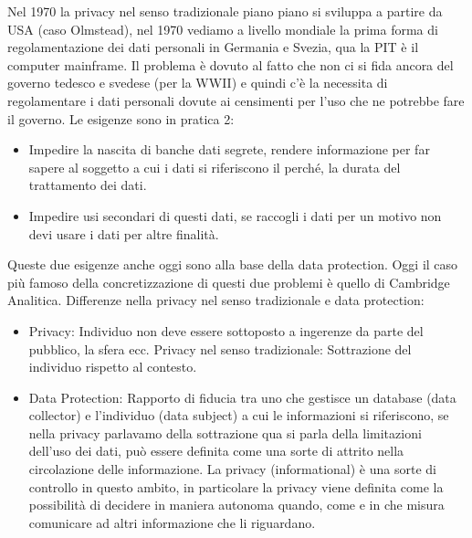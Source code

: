 \documentclass[a4page, 11pt, twocolumn]{article}
\begin{document}
Nel 1970 la privacy nel senso tradizionale piano piano si sviluppa a partire da USA (caso Olmstead), nel 1970 vediamo a livello mondiale la prima forma di regolamentazione dei dati personali in Germania e Svezia, qua la PIT è il computer mainframe. Il problema è dovuto al fatto che non ci si fida ancora del governo tedesco e svedese (per la WWII) e quindi c’è la necessita di regolamentare i dati personali dovute ai censimenti per l’uso che ne potrebbe fare il governo. Le esigenze sono in pratica 2:
\begin{itemize}
  \item Impedire la nascita di banche dati segrete, rendere informazione per far sapere al soggetto a cui i dati si riferiscono il perché, la durata del trattamento dei dati.
  \item Impedire usi secondari di questi dati, se raccogli i dati per un motivo non devi usare i dati per altre finalità.
\end{itemize}
Queste due esigenze anche oggi sono alla base della data protection. Oggi il caso più famoso della concretizzazione di questi due problemi è quello di Cambridge Analitica. \newline
Differenze nella privacy nel senso tradizionale e data protection:
\begin{itemize}
  \item Privacy: Individuo non deve essere sottoposto a ingerenze da parte del pubblico, la sfera ecc. \newline
    Privacy nel senso tradizionale: Sottrazione del individuo rispetto al contesto.
  \item Data Protection: Rapporto di fiducia tra uno che gestisce un database (data collector) e l’individuo (data subject) a cui le informazioni si riferiscono, se nella privacy parlavamo della sottrazione qua si parla della limitazioni dell’uso dei dati, può essere definita come una sorte di attrito nella circolazione delle informazione. La privacy (informational) è una sorte di controllo in questo ambito, in particolare la privacy viene definita come la possibilità di decidere in maniera autonoma quando, come e in che misura comunicare ad altri informazione che li riguardano. 
\end{itemize}
\end{document}
